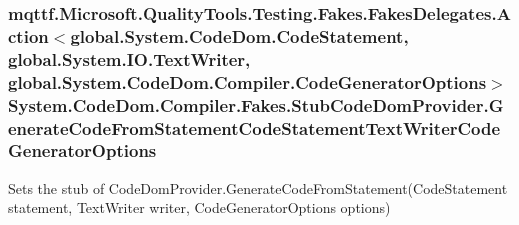 \hypertarget{class_system_1_1_code_dom_1_1_compiler_1_1_fakes_1_1_stub_code_dom_provider_a0f813325b50e2029239399ecd7641d91}{
\subsubsection[{Generate\-Code\-From\-Statement\-Code\-Statement\-Text\-Writer\-Code\-Generator\-Options}]{\setlength{\rightskip}{0pt plus 5cm}mqttf.\-Microsoft.\-Quality\-Tools.\-Testing.\-Fakes.\-Fakes\-Delegates.\-Action$<$global.\-System.\-Code\-Dom.\-Code\-Statement, global.\-System.\-I\-O.\-Text\-Writer, global.\-System.\-Code\-Dom.\-Compiler.\-Code\-Generator\-Options$>$ System.\-Code\-Dom.\-Compiler.\-Fakes.\-Stub\-Code\-Dom\-Provider.\-Generate\-Code\-From\-Statement\-Code\-Statement\-Text\-Writer\-Code\-Generator\-Options}}\label{class_system_1_1_code_dom_1_1_compiler_1_1_fakes_1_1_stub_code_dom_provider_a0f813325b50e2029239399ecd7641d91}


Sets the stub of Code\-Dom\-Provider.\-Generate\-Code\-From\-Statement(\-Code\-Statement statement, Text\-Writer writer, Code\-Generator\-Options options)

